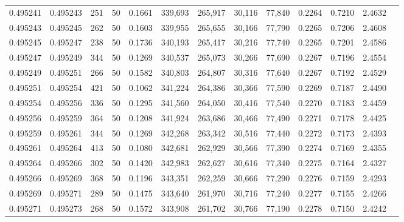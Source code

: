 \begin{tabular}{rrrrrrrrrrrrr}
0.495241 & 0.495243 &   251 &  50 &                                     0.1661 & 339,693 & 265,917 &  30,116 &  77,840 & 0.2264 & 0.7210 & 2.4632 \\
0.495243 & 0.495245 &   262 &  50 &                                     0.1603 & 339,955 & 265,655 &  30,166 &  77,790 & 0.2265 & 0.7206 & 2.4608 \\
0.495245 & 0.495247 &   238 &  50 &                                     0.1736 & 340,193 & 265,417 &  30,216 &  77,740 & 0.2265 & 0.7201 & 2.4586 \\
0.495247 & 0.495249 &   344 &  50 &                                     0.1269 & 340,537 & 265,073 &  30,266 &  77,690 & 0.2267 & 0.7196 & 2.4554 \\
0.495249 & 0.495251 &   266 &  50 &                                     0.1582 & 340,803 & 264,807 &  30,316 &  77,640 & 0.2267 & 0.7192 & 2.4529 \\
0.495251 & 0.495254 &   421 &  50 &                                     0.1062 & 341,224 & 264,386 &  30,366 &  77,590 & 0.2269 & 0.7187 & 2.4490 \\
0.495254 & 0.495256 &   336 &  50 &                                     0.1295 & 341,560 & 264,050 &  30,416 &  77,540 & 0.2270 & 0.7183 & 2.4459 \\
0.495256 & 0.495259 &   364 &  50 &                                     0.1208 & 341,924 & 263,686 &  30,466 &  77,490 & 0.2271 & 0.7178 & 2.4425 \\
0.495259 & 0.495261 &   344 &  50 &                                     0.1269 & 342,268 & 263,342 &  30,516 &  77,440 & 0.2272 & 0.7173 & 2.4393 \\
0.495261 & 0.495264 &   413 &  50 &                                     0.1080 & 342,681 & 262,929 &  30,566 &  77,390 & 0.2274 & 0.7169 & 2.4355 \\
0.495264 & 0.495266 &   302 &  50 &                                     0.1420 & 342,983 & 262,627 &  30,616 &  77,340 & 0.2275 & 0.7164 & 2.4327 \\
0.495266 & 0.495269 &   368 &  50 &                                     0.1196 & 343,351 & 262,259 &  30,666 &  77,290 & 0.2276 & 0.7159 & 2.4293 \\
0.495269 & 0.495271 &   289 &  50 &                                     0.1475 & 343,640 & 261,970 &  30,716 &  77,240 & 0.2277 & 0.7155 & 2.4266 \\
0.495271 & 0.495273 &   268 &  50 &                                     0.1572 & 343,908 & 261,702 &  30,766 &  77,190 & 0.2278 & 0.7150 & 2.4242 \\

\end{tabular}
